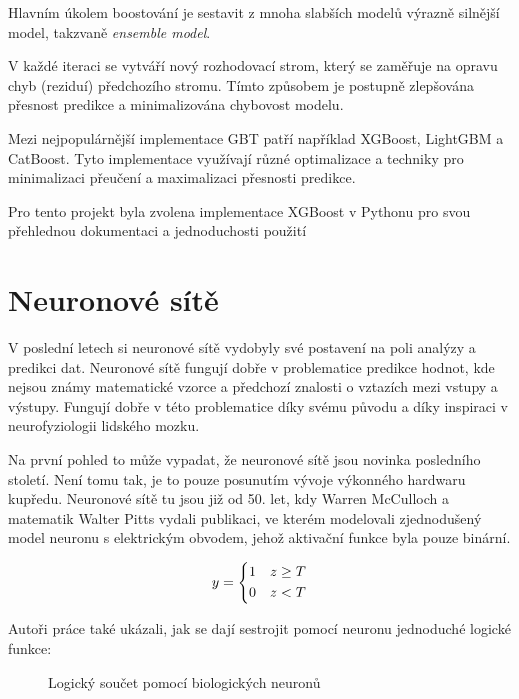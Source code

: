 \documentclass[FM,BP,fonts]{tulthesis}
\begin{document}
Hlavním úkolem boostování je sestavit z mnoha slabších modelů výrazně silnější model, takzvaně \textit{ensemble  model}. \cite{chen2016xgboost}

V každé iteraci se vytváří nový rozhodovací strom, který se zaměřuje na opravu chyb (reziduí) předchozího stromu. Tímto způsobem je postupně zlepšována přesnost predikce a minimalizována chybovost modelu. 

Mezi nejpopulárnější implementace GBT patří například XGBoost, LightGBM a CatBoost. Tyto implementace využívají různé optimalizace a techniky pro minimalizaci přeučení a maximalizaci přesnosti predikce.

Pro tento projekt byla zvolena implementace XGBoost v Pythonu pro svou přehlednou dokumentaci a jednoduchosti použití


\section{Neuronové sítě}
V poslední letech si neuronové sítě vydobyly své postavení na poli analýzy a predikci dat. Neuronové sítě fungují dobře v problematice predikce hodnot, kde nejsou známy matematické vzorce a předchozí znalosti o vztazích mezi vstupy a výstupy. Fungují dobře v této problematice díky svému původu a díky inspiraci v neurofyziologii lidského mozku.

Na první pohled to může vypadat, že neuronové sítě jsou novinka posledního století. Není tomu tak, je to pouze posunutím vývoje výkonného hardwaru kupředu. Neuronové sítě tu jsou již od 50. let, kdy Warren McCulloch a matematik Walter Pitts vydali publikaci, ve kterém modelovali zjednodušený model neuronu s elektrickým obvodem, jehož aktivační funkce byla pouze binární. \cite{mcculloch1943logical}

\begin{equation}
	y = \begin{dcases}
		1 & z \geq T \\
		0 & z < T
	\end{dcases}
\end{equation}

Autoři práce také ukázali, jak se dají sestrojit pomocí neuronu jednoduché logické funkce: 

\begin{figure}[htbp]
	\centering
	\caption{Logický součet pomocí biologických neuronů}
	\label{fig:logic_or}
\end{figure}
\end{document}
